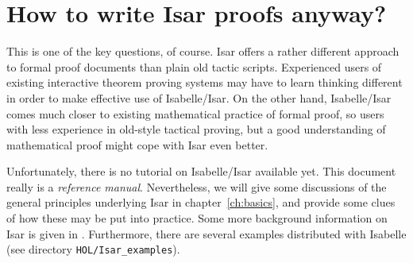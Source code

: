 \section{How to write Isar proofs anyway?}

This is one of the key questions, of course.  Isar offers a rather different
approach to formal proof documents than plain old tactic scripts.  Experienced
users of existing interactive theorem proving systems may have to learn
thinking different in order to make effective use of Isabelle/Isar.  On the
other hand, Isabelle/Isar comes much closer to existing mathematical practice
of formal proof, so users with less experience in old-style tactical proving,
but a good understanding of mathematical proof might cope with Isar even
better.

Unfortunately, there is no tutorial on Isabelle/Isar available yet.  This
document really is a \emph{reference manual}.  Nevertheless, we will give some
discussions of the general principles underlying Isar in
chapter~\ref{ch:basics}, and provide some clues of how these may be put into
practice.  Some more background information on Isar is given in
\cite{Wenzel:1999:TPHOL}.  Furthermore, there are several examples distributed
with Isabelle (see directory \texttt{HOL/Isar_examples}).


